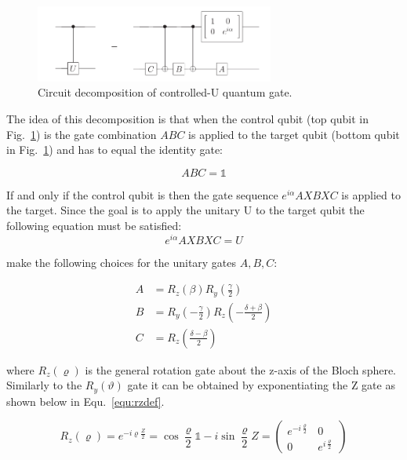\begin{figure}[ht]
   \centering
   \includegraphics[width=0.7\textwidth]{img/controlledudecomp.png}
   \caption[]{Circuit decomposition of controlled-U quantum gate.\footnotemark[15]}
   \label{img:cudecomposition}
\end{figure}


The idea of this decomposition is that when the control qubit (top qubit in Fig.~\ref{img:cudecomposition}) is \0 the gate combination $ABC$ is applied to the target qubit (bottom qubit in Fig.~\ref{img:cudecomposition}) and has to equal the identity gate:

\begin{equation}
\label{equ:abcidentity}
ABC = \mathbb{1}
\end{equation}

If and only if the control qubit is \1 then the gate sequence $e^{i\alpha}AXBXC$ is applied to the target. Since the goal is to apply the unitary U to the target qubit the following equation must be satisfied:
\begin{equation}
\label{equ:UAXBXC}
e^{i\alpha}AXBXC = U
\end{equation}

 make the following choices for the unitary gates $A,B,C$:

\begin{align}\label{equ:abc}
A &=  R_z(\beta)R_y(\frac{\gamma}{2})\\
B &= R_y(-\frac{\gamma}{2})R_z(-\frac{\delta+\beta}{2})\\
C &= R_z(\frac{\delta-\beta}{2})
\end{align}

where $R_z(\varrho)$ is the general rotation gate about the z-axis of the Bloch sphere. Similarly to the $R_y(\vartheta)$ gate it can be obtained by exponentiating the Z gate as shown below in Equ.~\ref{equ:rzdef}.

\begin{equation}
\label{equ:rzdef}
R_z(\varrho) = e^{-i\varrho\frac{Z}{2}} = \cos\frac{\varrho}{2} \mathbb{1}- i\sin\frac{\varrho}{2}Z = \begin{pmatrix}
e^{-i\frac{\varrho}{2}} & 0 \\
0 & e^{i\frac{\varrho}{2}}
\end{pmatrix}
\end{equation}

